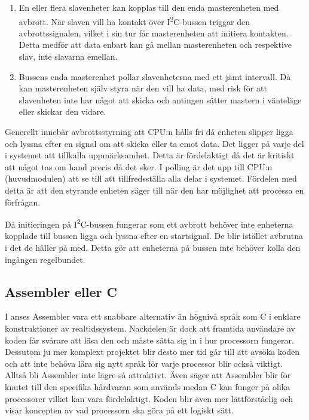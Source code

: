 \documentclass[11pt]{article}
\begin{document}
\begin{flushleft}
\begin{enumerate}
 \item En eller flera slavenheter kan kopplas till den enda masterenheten med avbrott. När slaven vill ha kontakt över I\textsuperscript{2}C-bussen triggar den avbrottssignalen, vilket i sin tur får masterenheten att initiera kontakten. Detta medför att data enbart kan gå mellan masterenheten och respektive slav, inte slavarna emellan.
 
 \item Bussens enda masterenhet pollar slavenheterna med ett jämt intervall. Då kan masterenheten själv styra när den vill ha data, med risk för att slavenheten inte har något att skicka och antingen sätter mastern i vänteläge eller skickar den vidare.
\end{enumerate}


Generellt innebär avbrottsstyrning att CPU:n hålls fri då enheten slipper ligga och lyssna efter en signal om att skicka eller ta emot data. Det ligger på varje del i systemet att tillkalla uppmärksamhet. Detta är fördelaktigt då det är kritiskt att något tas om hand precis då det sker. I polling är det upp till CPU:n (huvudmodulen) att se till att tillfredsställa alla delar i systemet. Fördelen med detta är att den styrande enheten säger till när den har möjlighet att processa en förfrågan. \cite{interruptPoll}


Då initieringen på I\textsuperscript{2}C-bussen fungerar som ett avbrott behöver inte enheterna kopplade till bussen ligga och lyssna efter en startsignal. De blir istället avbrutna i det de håller på med.\cite{guideI2C} Detta gör att enheterna på bussen inte behöver kolla den ingången regelbundet. 


\subsection{Assembler eller C}

I \cite{RWD} anses Assembler vara ett snabbare alternativ än högnivå språk som C i enklare konstruktioner av realtidssystem. Nackdelen är dock att framtida användare av koden får svårare att läsa den och måste sätta sig in i hur processorn fungerar. Dessutom ju mer komplext projektet blir desto mer tid går till att avsöka koden och att inte behöva lära sig nytt språk för varje processor blir också viktigt. Alltså bli Assembler inte lägre så attraktivt. Även \cite{CPM} säger att Assembler blir för knutet till den specifika hårdvaran som används medan C kan funger på olika processorer vilket kan vara fördelaktigt. Koden blir även mer lättförståelig och visar koncepten av vad processorn ska göra på ett logiskt sätt. 


\end{flushleft}
\end{document}

